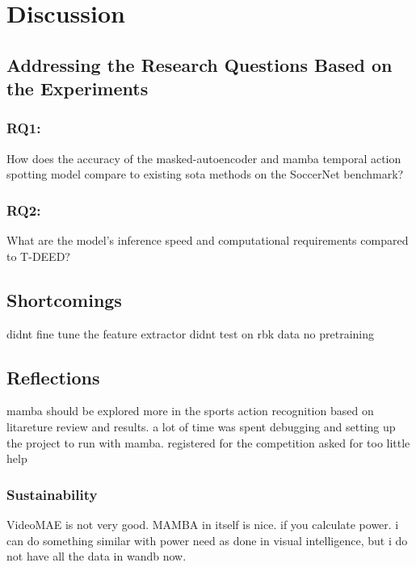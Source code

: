 \chapter{Discussion}
\label{chap:discussion}

\section{Addressing the Research Questions Based on the Experiments}

\subsection{RQ1:} 
How does the accuracy of the masked-autoencoder and mamba temporal action spotting model compare to existing \acrlong{sota} methods on the SoccerNet benchmark?
\subsection{RQ2:} 
What are the model’s inference speed and computational requirements compared to T-DEED?


\section{Shortcomings}
didnt fine tune the feature extractor
didnt test on rbk data
no pretraining


\section{Reflections}
mamba should be explored more in the sports action recognition based on litareture review and results. 
a lot of time was spent debugging and setting up the project to run with mamba. 
registered for the competition
asked for too little help

\subsection{Sustainability}
VideoMAE is not very good. MAMBA in itself is nice. if you calculate power. i can do something similar with power need as done in visual intelligence, but i do not have all the data in wandb now. 